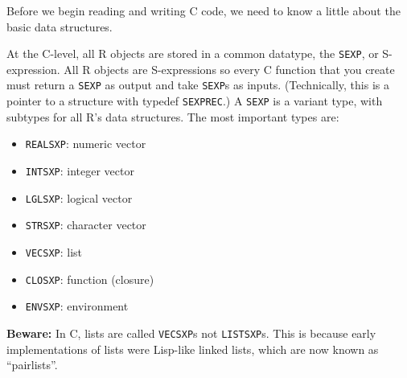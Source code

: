 \begin{Shaded}
\begin{Highlighting}[]
\StringTok{ }\NormalTok{(}\NormalTok{(} \NormalTok{, } \NormalTok{), }

\NormalTok{)}
\NormalTok{(}\NormalTok{, }\NormalTok{)}
\end{Highlighting}
\end{Shaded}

Before we begin reading and writing C code, we need to know a little
about the basic data structures.


At the C-level, all R objects are stored in a common datatype, the
\texttt{SEXP}, or S-expression. All R objects are S-expressions so every
C function that you create must return a \texttt{SEXP} as output and
take \texttt{SEXP}s as inputs. (Technically, this is a pointer to a
structure with typedef \texttt{SEXPREC}.) A \texttt{SEXP} is a variant
type, with subtypes for all R's data structures. The most important
types are: 

\begin{itemize}
\itemsep1pt\parskip0pt
\item
  \texttt{REALSXP}: numeric vector
\item
  \texttt{INTSXP}: integer vector
\item
  \texttt{LGLSXP}: logical vector
\item
  \texttt{STRSXP}: character vector
\item
  \texttt{VECSXP}: list
\item
  \texttt{CLOSXP}: function (closure)
\item
  \texttt{ENVSXP}: environment
\end{itemize}

\textbf{Beware:} In C, lists are called \texttt{VECSXP}s not
\texttt{LISTSXP}s. This is because early implementations of lists were
Lisp-like linked lists, which are now known as ``pairlists''.

